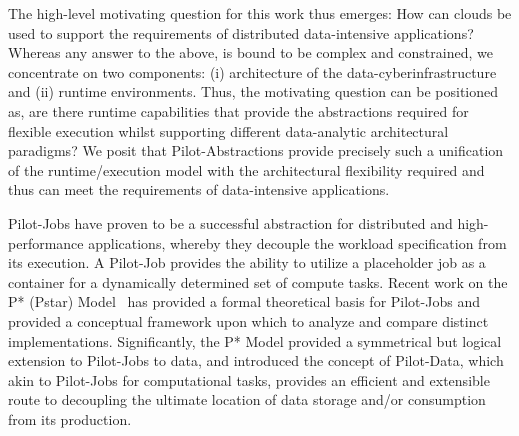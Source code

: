 \documentclass[times]{cpeauth}
\newcommand{\pilot}{Pilot\xspace}
\newcommand{\pilotjob}{Pilot-Job\xspace}
\newcommand{\pilotjobs}{Pilot-Jobs\xspace}
\begin{document}


The high-level motivating question for this work thus emerges: How can
clouds be used to support the requirements of distributed
data-intensive applications?  Whereas any answer to the above, is
bound to be complex and constrained, we concentrate on two components:
(i) architecture of the data-cyberinfrastructure and (ii) runtime
environments. Thus, the motivating question can be positioned as, are
there runtime capabilities that provide the abstractions required for
flexible execution whilst supporting different data-analytic
architectural paradigms?  We posit that \pilot-Abstractions provide
precisely such a unification of the runtime/execution model with the
architectural flexibility required and thus can meet the requirements
of data-intensive applications.


\pilotjobs have proven to be a successful abstraction for distributed
and high-performance applications, whereby they decouple the workload
specification from its execution. A \pilotjob provides the ability to
utilize a placeholder job as a container for a dynamically determined
set of compute tasks. Recent work on the P* (Pstar)
Model~\cite{pstar12} has provided a formal theoretical basis for
Pilot-Jobs and provided a conceptual framework upon which to analyze
and compare distinct implementations. Significantly, the P* Model
provided a symmetrical but logical extension to Pilot-Jobs to data,
and introduced the concept of Pilot-Data, which akin to Pilot-Jobs for
computational tasks, provides an efficient and extensible route to
decoupling the ultimate location of data storage and/or consumption
from its production.  
\end{document}
